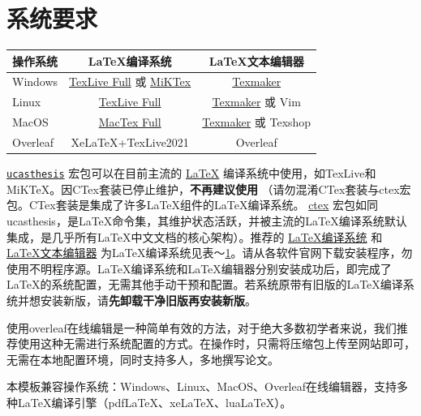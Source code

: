 {\section{系统要求}\label{sec:system}
\begin{table}
    \footnotesize%
    \setlength{\tabcolsep}{4pt}%
    \renewcommand{\arraystretch}{1.5}%
    \centering
    \begin{tabular}{lcc}
        \toprule
        操作系统 & LaTeX编译系统 & LaTeX文本编辑器\\
        \midrule
        Windows & \href{https://www.tug.org/texlive/acquire-netinstall.html}{TexLive Full} 或 \href{https://miktex.org/download}{MiKTex} & \href{http://www.xm1math.net/texmaker/}{Texmaker}\\
        Linux & \href{https://www.tug.org/texlive/acquire-netinstall.html}{TexLive Full} & \href{http://www.xm1math.net/texmaker/}{Texmaker} 或 Vim\\
        MacOS & \href{https://www.tug.org/mactex/}{MacTex Full} & \href{http://www.xm1math.net/texmaker/}{Texmaker} 或 Texshop\\
        Overleaf & XeLaTeX+TexLive2021 & Overleaf \\
        \bottomrule
    \end{tabular}
    \label{tab:compiler}
\end{table}
\href{https://github.com/mohuangrui/ucasthesis}{\texttt{ucasthesis}} 宏包可以在目前主流的 \href{https://en.wikibooks.org/wiki/LaTeX/Introduction}{LaTeX} 编译系统中使用，如TexLive和MiKTeX。因CTex套装已停止维护，\textbf{不再建议使用} （请勿混淆CTex套装与ctex宏包。CTex套装是集成了许多LaTeX组件的LaTeX编译系统。 \href{https://ctan.org/pkg/ctex?lang=en}{ctex} 宏包如同ucasthesis，是LaTeX命令集，其维护状态活跃，并被主流的LaTeX编译系统默认集成，是几乎所有LaTeX中文文档的核心架构）。推荐的 \href{https://en.wikibooks.org/wiki/LaTeX/Installation}{LaTeX编译系统} 和 \href{https://en.wikibooks.org/wiki/LaTeX/Installation}{LaTeX文本编辑器} 为LaTeX编译系统见表～\ref{tab:compiler}。请从各软件官网下载安装程序，勿使用不明程序源。LaTeX编译系统和LaTeX编辑器分别安装成功后，即完成了LaTeX的系统配置，无需其他手动干预和配置。若系统原带有旧版的LaTeX编译系统并想安装新版，请\textbf{先卸载干净旧版再安装新版}。

使用overleaf在线编辑是一种简单有效的方法，对于绝大多数初学者来说，我们推荐使用这种无需进行系统配置的方式。在操作时，只需将压缩包上传至网站即可，无需在本地配置环境，同时支持多人，多地撰写论文。

本模板兼容操作系统：Windows、Linux、MacOS、Overleaf在线编辑器，支持多种LaTeX编译引擎（pdfLaTeX、xeLaTeX、luaLaTeX）。}
